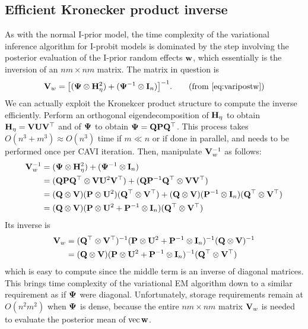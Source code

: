 
\subsection{Efficient Kronecker product inverse}
\label{sec:complxiprobit}

As with the normal I-prior model, the time complexity of the variational inference algorithm for I-probit models is dominated by the step involving the posterior evaluation of the I-prior random effects ${\mathbf w}$, which essentially is the inversion of an $nm \times nm$ matrix.
The matrix in question is %
\begin{align}
  \bV_w = \big[ (\bPsi \otimes \bH_\eta^2) + (\bPsi^{-1} \otimes \bI_n) \big]^{-1}. \tag{from \ref{eq:varipostw}}
\end{align}
We can actually exploit the Kronekcer product structure to compute the inverse efficiently.
Perform an orthogonal eigendecomposition of ${\mathbf H}_\eta$ to obtain ${\mathbf H}_\eta = {\mathbf V}{\mathbf U}{\mathbf V}^\top$ and of ${\bm\Psi}$ to obtain ${\bm\Psi} = {\mathbf Q}{\mathbf P}{\mathbf Q}^\top$.
This process takes $O(n^3 + m^3) \approx O(n^3)$ time if $m\ll n$ or if done in parallel, and needs to be performed once per CAVI iteration.
Then, manipulate ${\mathbf V}_w^{-1}$ as follows:
\begin{align*}
  {\mathbf V}_w^{-1} 
  &= ({\bm\Psi} \otimes {\mathbf H}_\eta^2) + ({\bm\Psi}^{-1} \otimes {\mathbf I}_n) \\
  &= ({\mathbf Q}{\mathbf P}{\mathbf Q}^\top \otimes {\mathbf V}{\mathbf U}^2{\mathbf V}^\top) + ({\mathbf Q}{\mathbf P}^{-1}{\mathbf Q}^\top \otimes {\mathbf V}{\mathbf V}^\top) \\
  &= ({\mathbf Q} \otimes {\mathbf V})({\mathbf P} \otimes {\mathbf U}^2)({\mathbf Q}^\top \otimes {\mathbf V}^\top) + 
  ({\mathbf Q} \otimes {\mathbf V})({\mathbf P}^{-1} \otimes {\mathbf I}_n)({\mathbf Q}^\top \otimes {\mathbf V}^\top) \\
  &= ({\mathbf Q} \otimes {\mathbf V})({\mathbf P} \otimes {\mathbf U}^2 + {\mathbf P}^{-1} \otimes {\mathbf I}_n)({\mathbf Q}^\top \otimes {\mathbf V}^\top) 
\end{align*}
Its inverse is 
\begin{align*}
  {\mathbf V}_w 
  &=  ({\mathbf Q}^\top \otimes {\mathbf V}^\top)^{-1}({\mathbf P} \otimes {\mathbf U}^2 + {\mathbf P}^{-1} \otimes {\mathbf I}_n)^{-1} ({\mathbf Q} \otimes {\mathbf V})^{-1} \\
  &= ({\mathbf Q} \otimes {\mathbf V})({\mathbf P} \otimes {\mathbf U}^2 + {\mathbf P}^{-1} \otimes {\mathbf I}_n)^{-1}({\mathbf Q}^\top \otimes {\mathbf V}^\top)
\end{align*}
which is easy to compute since the middle term is an inverse of diagonal matrices.
This brings time complexity of the variational EM algorithm down to a similar requirement as if ${\bm\Psi}$ were diagonal.
Unfortunately, storage requirements remain at $O(n^2m^2)$ when ${\bm\Psi}$ is dense, because the entire $nm \times nm$ matrix ${\mathbf V}_w$ is needed to evaluate the posterior mean of $\operatorname{vec}{\mathbf w}$.

